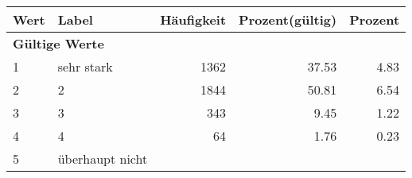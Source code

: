      \begin{longtable}{lXrrr}
     \toprule
     \textbf{Wert} & \textbf{Label} & \textbf{Häufigkeit} & \textbf{Prozent(gültig)} & \textbf{Prozent} \\
     \endhead
     \midrule
     \multicolumn{5}{l}{\textbf{Gültige Werte}}\\

     1 &
     \multicolumn{1}{X}{ sehr stark   } &


       \num{1362} &
       \num[round-mode=places,round-precision=2]{37,53} &
         \num[round-mode=places,round-precision=2]{4,83} \\

     2 &
     \multicolumn{1}{X}{ 2   } &


       \num{1844} &
       \num[round-mode=places,round-precision=2]{50,81} &
         \num[round-mode=places,round-precision=2]{6,54} \\

     3 &
     \multicolumn{1}{X}{ 3   } &


       \num{343} &
       \num[round-mode=places,round-precision=2]{9,45} &
         \num[round-mode=places,round-precision=2]{1,22} \\

     4 &
     \multicolumn{1}{X}{ 4   } &


       \num{64} &
       \num[round-mode=places,round-precision=2]{1,76} &
         \num[round-mode=places,round-precision=2]{0,23} \\

     5 &
     \multicolumn{1}{X}{ überhaupt nicht   } &



\end{longtable}

